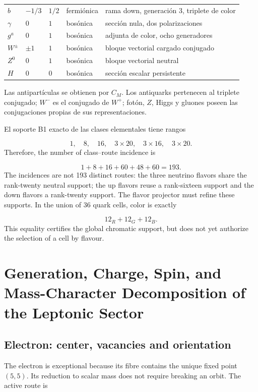 \begin{longtable}{L{2.03cm}L{2.03cm}L{1.87cm}L{2.34cm}L{6.55cm}}
\(b\) & \(-1/\allowbreak{}3\) & \(1/\allowbreak{}2\) & fermiónica & rama down, generación 3, triplete de color \\
\(\gamma\) & \(0\) & \(1\) & bosónica & sección nula, dos polarizaciones \\
\(g^a\) & \(0\) & \(1\) & bosónica & adjunta de color, ocho generadores \\
\(W^\pm\) & \(\pm1\) & \(1\) & bosónica & bloque vectorial cargado conjugado \\
\(Z^0\) & \(0\) & \(1\) & bosónica & bloque vectorial neutral \\
\(H\) & \(0\) & \(0\) & bosónica & sección escalar persistente \\
\end{longtable}
\endgroup
Las antipartículas se obtienen por \(C_M\). Los antiquarks pertenecen al triplete conjugado; \(W^-\) es el conjugado de \(W^+\); fotón, \(Z\), Higgs y gluones poseen las conjugaciones propias de sus representaciones.

El soporte B1 exacto de las clases elementales tiene rangos

\[
 1,\quad8,\quad16,\quad
 3\times20,\quad
 3\times16,\quad
 3\times20.
\]
Therefore, the number of class--route incidence is

\[
 1+8+16+60+48+60=193.
\]
The incidences are not 193 distinct routes: the three neutrino flavors share the rank-twenty neutral support; the up flavors reuse a rank-sixteen support and the down flavors a rank-twenty support. The flavor projector must refine these supports. In the union of 36 quark cells, color is exactly

\[
 12_R+12_G+12_B.
\]
This equality certifies the global chromatic support, but does not yet authorize the selection of a cell by flavour.

\section{Generation, Charge, Spin, and Mass-Character Decomposition of the Leptonic Sector}
\subsection{Electron: center, vacancies and orientation}
The electron is exceptional because its fibre contains the unique fixed point \((5,5)\). Its reduction to scalar mass does not require breaking an orbit. The active route is

